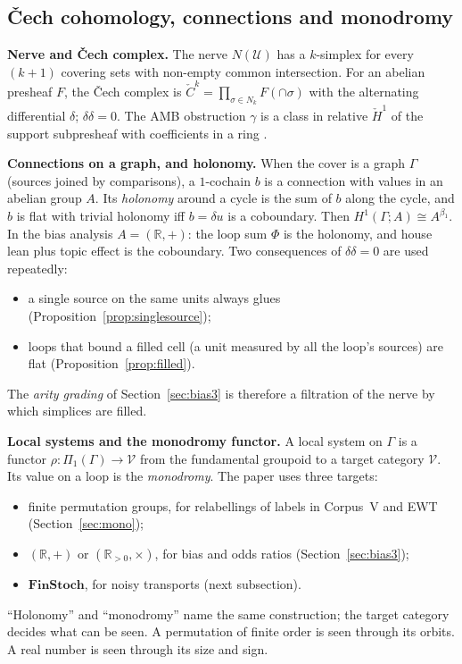 \documentclass[11pt]{article}
\theoremstyle{definition}
\theoremstyle{remark}
\newcommand{\R}{\mathbb{R}}
\begin{document}
\subsection{\v{C}ech cohomology, connections and monodromy}
\textbf{Nerve and \v{C}ech complex.} The nerve $N(\mathcal U)$ has a $k$-simplex for every $(k+1)$ covering sets with non-empty common intersection. For an abelian presheaf $F$, the \v{C}ech complex is $\check C^k=\prod_{\sigma\in N_k}F(\cap\sigma)$ with the alternating differential $\delta$; $\delta\delta=0$. The AMB obstruction $\gamma$ is a class in relative $\check H^1$ of the support subpresheaf with coefficients in a ring \cite{amb12}.

\textbf{Connections on a graph, and holonomy.} When the cover is a graph $\Gamma$ (sources joined by comparisons), a $1$-cochain $b$ is a connection with values in an abelian group $A$. Its \emph{holonomy} around a cycle is the sum of $b$ along the cycle, and $b$ is flat with trivial holonomy iff $b=\delta u$ is a coboundary. Then $H^1(\Gamma;A)\cong A^{\beta_1}$. In the bias analysis $A=(\R,+)$: the loop sum $\Phi$ is the holonomy, and house lean plus topic effect is the coboundary. Two consequences of $\delta\delta=0$ are used repeatedly:
\begin{itemize}
  \item a single source on the same units always glues (Proposition~\ref{prop:singlesource});
  \item loops that bound a filled cell (a unit measured by all the loop's sources) are flat (Proposition~\ref{prop:filled}).
\end{itemize}
The \emph{arity grading} of Section~\ref{sec:bias3} is therefore a filtration of the nerve by which simplices are filled.

\textbf{Local systems and the monodromy functor.} A local system on $\Gamma$ is a functor $\rho:\Pi_1(\Gamma)\to\mathcal V$ from the fundamental groupoid to a target category $\mathcal V$. Its value on a loop is the \emph{monodromy}. The paper uses three targets:
\begin{itemize}
  \item finite permutation groups, for relabellings of labels in Corpus~V and EWT (Section~\ref{sec:mono});
  \item $(\R,+)$ or $(\R_{>0},\times)$, for bias and odds ratios (Section~\ref{sec:bias3});
  \item $\mathbf{FinStoch}$, for noisy transports (next subsection).
\end{itemize}
``Holonomy'' and ``monodromy'' name the same construction; the target category decides what can be seen. A permutation of finite order is seen through its orbits. A real number is seen through its size and sign.
\end{document}
